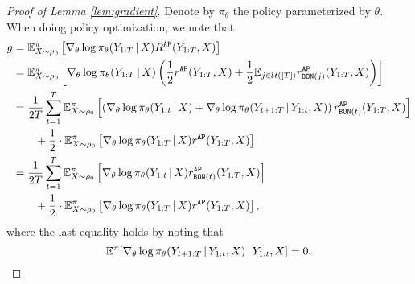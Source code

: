 \begin{proof}[Proof of Lemma \ref{lem:gradient}]\label{app:lem:gradient}
Denote by $\pi_\theta$ the policy parameterized by $\theta$.
When doing policy optimization, we note that 
\begin{align}
    g &= \mathbb{E}_{X\sim\rho_0}^\pi  \left[\nabla_\theta \log \pi_\theta(Y_{1:T}{\,|\,} X) R^{\mathtt{AP}} (Y_{1:T}, X) \right] \notag\\
   &= \mathbb{E}_{X\sim\rho_0}^\pi \left[\nabla_\theta \log \pi_\theta(Y_{1:T}{\,|\,} X) \left(\frac 1 2 r^{\mathtt{AP}}(Y_{1:T}, X) + \frac 1 2 \mathbb{E}_{j\in \mathcal{U}([T])} r_{{\mathtt{BON}}(j)}^{\mathtt{AP}}(Y_{1:T}, X)\right)\right] \notag\\
   &= \frac {1} {2T} \sum_{t=1}^T \mathbb{E}_{X\sim\rho_0}^\pi \left[\left(\nabla_\theta \log \pi_\theta(Y_{1:t}{\,|\,} X) + \nabla_\theta \log \pi_\theta(Y_{t+1:T}{\,|\,} Y_{1:t}, X) \right) r_{{\mathtt{BON}}(t)}^{\mathtt{AP}}(Y_{1:T}, X)\right] \notag\\
   &\qquad +  \frac 1 2 \cdot \mathbb{E}_{X\sim\rho_0}^\pi \left[\nabla_\theta \log \pi_\theta(Y_{1:T}{\,|\,} X)  r^{\mathtt{AP}}(Y_{1:T}, X) \right] \notag\\
   &= \frac {1} {2T} \sum_{t=1}^T \mathbb{E}_{X\sim\rho_0}^\pi \left[\nabla_\theta \log \pi_\theta(Y_{1:t}{\,|\,} X)  r_{{\mathtt{BON}}(t)}^{\mathtt{AP}}(Y_{1:T}, X)\right] \notag\\
   &\qquad +  \frac 1 2 \cdot \mathbb{E}_{X\sim\rho_0}^\pi \left[\nabla_\theta \log \pi_\theta(Y_{1:T}{\,|\,} X)  r^{\mathtt{AP}}(Y_{1:T}, X) \right], 
\end{align}
where the last equality holds by noting that 
$$\mathbb{E}^\pi[\nabla_\theta \log \pi_\theta(Y_{t+1:T}{\,|\,} Y_{1:t}, X) {\,|\,} Y_{1:t}, X]=0.$$
\end{proof}


